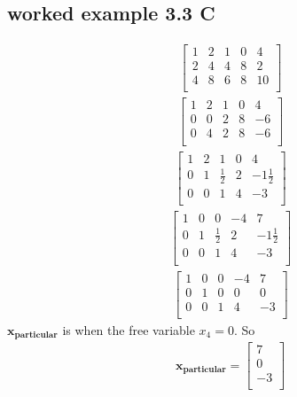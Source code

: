 \documentclass[a4paper,11pt]{article}
\newcommand{\mybf}[1]{\boldsymbol{#1}}
\begin{document}
\subsection*{worked example 3.3 C}
\begin{align}
\left[
\begin{array}{cccc|c}
1 & 2 & 1 & 0 & 4 \\
2 & 4 & 4 & 8 & 2 \\
4 & 8 & 6 & 8 & 10 \\
\end{array}
\right]
\end{align}
\begin{align}
\left[
\begin{array}{cccc|c}
1 & 2 & 1 & 0 & 4 \\
0 & 0 & 2 & 8 & -6 \\
0 & 4 & 2 & 8 & -6 \\
\end{array}
\right]
\end{align}
\begin{align}
\left[
\begin{array}{cccc|c}
1 & 2 & 1           & 0 & 4 \\
0 & 1 & \frac{1}{2} & 2 & -1\frac{1}{2} \\
0 & 0 & 1           & 4 & -3 \\
\end{array}
\right]
\end{align}
\begin{align}
\left[
\begin{array}{cccc|c}
1 & 0 & 0           & -4 & 7 \\
0 & 1 & \frac{1}{2} & 2 & -1\frac{1}{2} \\
0 & 0 & 1           & 4 & -3 \\
\end{array}
\right]
\end{align}
\begin{align}
\left[
\begin{array}{cccc|c}
1 & 0 & 0 & -4 & 7 \\
0 & 1 & 0 & 0  & 0 \\
0 & 0 & 1 & 4  & -3 \\
\end{array}
\right]
\end{align}
$\mybf{x_{particular}}$ is when the free variable $x_4=0$. So
\begin{align}
\mybf{x_{particular}} = 
\begin{bmatrix}
7 \\
0 \\
-3 \\
\end{bmatrix} 
\end{align}
\end{document}
